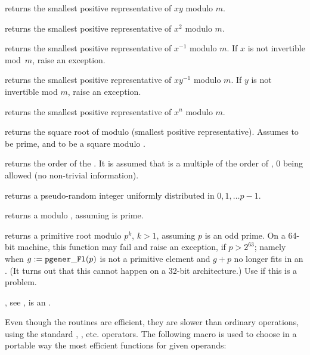  returns the smallest positive
representative of $x y$ modulo $m$.

 returns the smallest positive
representative of $x^2$ modulo $m$.

 returns the smallest
positive representative of $x^{-1}$ modulo $m$. If $x$ is not invertible
mod~$m$, raise an exception.

 returns the smallest
positive representative of $x y^{-1}$ modulo $m$. If $y$ is not invertible
mod $m$, raise an exception.

 returns the smallest
positive representative of $x^n$ modulo $m$.

 returns the square root of 
modulo  (smallest positive representative). Assumes  to be
prime, and  to be a square modulo .

 returns the order of the
 . It is assumed that  is a multiple of the order of
, $0$ being allowed (no non-trivial information).

 returns a pseudo-random integer uniformly
distributed in $0, 1, \dots p-1$.

 returns a  modulo ,
assuming  is prime.

 returns a primitive root modulo $p^k$, $k
> 1$, assuming $p$ is an odd prime. On a 64-bit machine,
this function may fail and raise an exception, if $p > 2^{63}$; namely
when $g := {\tt pgener\_Fl}(p)$ is not a primitive element and $g + p$ no
longer fits in an . (It turns out that this cannot happen on a
32-bit architecture.) Use  if this is a problem.

, see ,
 is an .


Even though the  routines are efficient, they are slower than
ordinary  operations, using the standard \kbd{+}, \kbd{\%}, etc.
operators.
The following macro is used to choose in a portable way the most efficient
functions for given operands:

